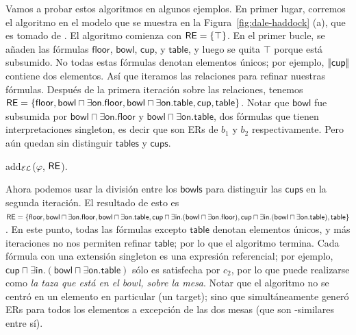 Vamos a probar estos algoritmos en algunos ejemplos. En primer lugar, corremos el \el algoritmo en el modelo que se muestra en la Figura~\ref{fig:dale-haddock} (a), que es
tomado de \cite{dale91:gener}. El
algoritmo comienza con $ \textsf{RE} = \{\top \} $. En el primer bucle, se a\~naden
las f\'ormulas $\mathsf{floor}$, $\mathsf{bowl}$, $\mathsf{cup}$, y
$\mathsf{table}$, y luego se quita $\top$ porque est\'a subsumido.
No todas estas f\'ormulas denotan elementos \'unicos; por ejemplo,
$|\!|\mathsf{cup}|\!|$ contiene dos elementos. As\'i que iteramos
las relaciones para refinar nuestras f\'ormulas. Despu\'es de la primera iteraci\'on sobre
las relaciones, tenemos  $\textsf{RE} = \{ \mathsf{floor}, \mathsf{bowl} \sqcap
\exists \mathsf{on}.\mathsf{floor}, \mathsf{bowl} \sqcap \exists
\mathsf{on}.\mathsf{table}, \mathsf{cup}, \mathsf{table} \}$. Notar que
$\mathsf{bowl}$ fue subsumida por $\mathsf{bowl} \sqcap
\exists \mathsf{on}.\mathsf{floor}$ y $\mathsf{bowl} \sqcap \exists
\mathsf{on}.\mathsf{table}$, dos f\'ormulas que tienen interpretaciones singleton, es decir que son ERs de $b_1$ y $b_2$ respectivamente. Pero a\'un quedan sin distinguir $\mathsf{tables}$ y $\mathsf{cups}$.

%
\begin{megaalgorithm}[t]%
\dontprintsemicolon
\caption{add$_\mathcal{EL}$($\varphi$, $\textsf{RE}$).}
\label{algo:bisim-add-el}
\end{megaalgorithm}
Ahora podemos usar la divisi\'on entre los $\mathsf{bowls}$ para distinguir las $\mathsf{cups}$ en
la segunda iteraci\'on. El resultado de esto es $\textsf{RE} = \{ \mathsf{floor},
\mathsf{bowl} \sqcap \exists \mathsf{on}.\mathsf{floor}, \mathsf{bowl}
\sqcap \exists \mathsf{on}.\mathsf{table}, \mathsf{cup} \sqcap \exists
\mathsf{in}. (\mathsf{bowl} \sqcap \exists
\mathsf{on}.\mathsf{floor}), \mathsf{cup} \sqcap \exists
\mathsf{in}. (\mathsf{bowl} \sqcap \exists
\mathsf{on}.\mathsf{table}), \mathsf{table} \}$. En este punto, todas las
f\'ormulas excepto $ \mathsf{table} $ denotan elementos \'unicos, y m\'as
iteraciones no nos permiten refinar $ \mathsf {table} $; por lo que el algoritmo
termina. Cada f\'ormula con una extensi\'on singleton es una expresi\'on referencial; por ejemplo, $\mathsf{cup} \sqcap \exists
\mathsf{in}. (\mathsf{bowl} \sqcap \exists \mathsf{on}.\mathsf{table})$ s\'olo es satisfecha por $ c_2 $, por lo que puede
realizarse como \textit{la taza que est\'a en el bowl, sobre la mesa}. Notar que
el algoritmo no se centr\'o en un elemento en particular (un target); sino que 
simult\'aneamente gener\'o ERs para todos los elementos a excepci\'on de las dos
mesas (que son \EL-similares entre s\'i).


